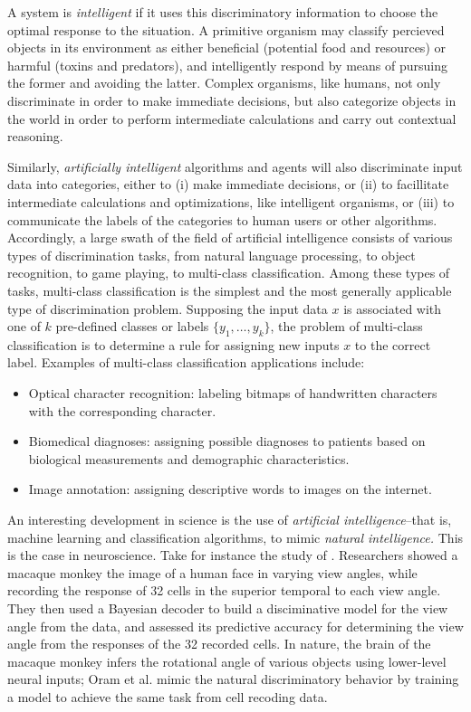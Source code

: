 A system is \emph{intelligent} if it uses this discriminatory
information to choose the optimal response to the situation.  A
primitive organism may classify percieved objects in its environment
as either beneficial (potential food and resources) or harmful (toxins
and predators), and intelligently respond by means of pursuing the
former and avoiding the latter.  Complex organisms, like humans, not
only discriminate in order to make immediate decisions, but also
categorize objects in the world in order to perform intermediate
calculations and carry out contextual reasoning.  


Similarly, \emph{artificially intelligent} algorithms and agents will
also discriminate input data into categories, either to (i) make
immediate decisions, or (ii) to facillitate intermediate calculations
and optimizations, like intelligent organisms, or (iii) to communicate
the labels of the categories to human users or other algorithms.
Accordingly, a large swath of the field of artificial intelligence
consists of various types of discrimination tasks, from natural
language processing, to object recognition, to game playing, to
multi-class classification.  Among these types of tasks, multi-class
classification is the simplest and the most generally applicable
type of discrimination problem.  Supposing the input data $x$ is
associated with one of $k$ pre-defined classes or labels
$\{y_1,\hdots, y_k\}$, the problem of multi-class classification is to
determine a rule for assigning new inputs $x$ to the correct label.
Examples of multi-class classification applications include:
\begin{itemize}
\item Optical character recognition: labeling bitmaps of handwritten characters with the corresponding character.
\item Biomedical diagnoses: assigning possible diagnoses to patients based on biological measurements and demographic characteristics.
\item Image annotation: assigning descriptive words to images on the internet.
\end{itemize}

An interesting development in science is the use of \emph{artificial
  intelligence}--that is, machine learning and classification
algorithms, to mimic \emph{natural intelligence.}  This is the case in
neuroscience.  Take for instance the study of \cite{oram1998theideal}.
Researchers showed a macaque monkey the image of a human face in
varying view angles, while recording the response of 32 cells in the
superior temporal to each view angle.  They then used a Bayesian
decoder to build a disciminative model for the view angle from the
data, and assessed its predictive accuracy for determining the view
angle from the responses of the 32 recorded cells.  In nature, the
brain of the macaque monkey infers the rotational angle of various
objects using lower-level neural inputs; Oram et al. mimic the natural
discriminatory behavior by training a model to achieve the same task
from cell recoding data.


